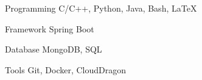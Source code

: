 

\begin{cvskills}

  \cvskill
    {Programming} %
    {C/C++, Python, Java, Bash, LaTeX} %

  \cvskill
    {Framework} %
    {Spring Boot} %

  \cvskill
    {Database} %
    {MongoDB, SQL} %

 \cvskill
    {Tools} %
    {Git, Docker, CloudDragon} %


\end{cvskills}
